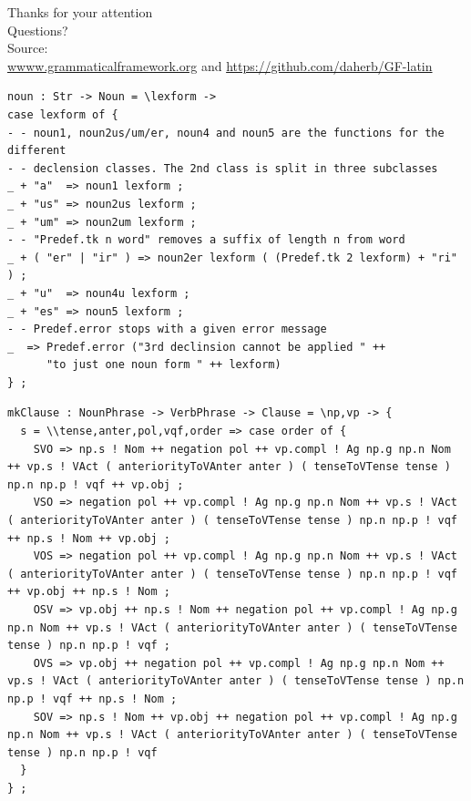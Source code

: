 \documentclass[compress,table]{beamer} %
\newcommand{\nologo}{\setbeamertemplate{logo}{}}
\begin{document}
\begin{frame}
  {\huge
  Thanks for your attention \\[3em]
  \pause
  Questions? \\[2em]
  }
  Source:\\ \url{wwww.grammaticalframework.org} and \url{https://github.com/daherb/GF-latin}
\end{frame}
\appendix



{\nologo 
  \begin{frame}[fragile]
    \begin{lstlisting}[basicstyle=\tiny\ttfamily]
noun : Str -> Noun = \lexform -> 
case lexform of {
- - noun1, noun2us/um/er, noun4 and noun5 are the functions for the different
- - declension classes. The 2nd class is split in three subclasses
_ + "a"  => noun1 lexform ;
_ + "us" => noun2us lexform ;
_ + "um" => noun2um lexform ;
- - "Predef.tk n word" removes a suffix of length n from word
_ + ( "er" | "ir" ) => noun2er lexform ( (Predef.tk 2 lexform) + "ri" ) ;
_ + "u"  => noun4u lexform ;
_ + "es" => noun5 lexform ;
- - Predef.error stops with a given error message
_  => Predef.error ("3rd declinsion cannot be applied " ++
      "to just one noun form " ++ lexform)
} ;
  \end{lstlisting}
\end{frame}
}

{\nologo 
  \begin{frame}[fragile]
    \begin{lstlisting}[basicstyle=\tiny\ttfamily]
mkClause : NounPhrase -> VerbPhrase -> Clause = \np,vp -> {
  s = \\tense,anter,pol,vqf,order => case order of {
    SVO => np.s ! Nom ++ negation pol ++ vp.compl ! Ag np.g np.n Nom ++ vp.s ! VAct ( anteriorityToVAnter anter ) ( tenseToVTense tense ) np.n np.p ! vqf ++ vp.obj ;
    VSO => negation pol ++ vp.compl ! Ag np.g np.n Nom ++ vp.s ! VAct ( anteriorityToVAnter anter ) ( tenseToVTense tense ) np.n np.p ! vqf ++ np.s ! Nom ++ vp.obj ;
    VOS => negation pol ++ vp.compl ! Ag np.g np.n Nom ++ vp.s ! VAct ( anteriorityToVAnter anter ) ( tenseToVTense tense ) np.n np.p ! vqf ++ vp.obj ++ np.s ! Nom ;
    OSV => vp.obj ++ np.s ! Nom ++ negation pol ++ vp.compl ! Ag np.g np.n Nom ++ vp.s ! VAct ( anteriorityToVAnter anter ) ( tenseToVTense tense ) np.n np.p ! vqf ;
    OVS => vp.obj ++ negation pol ++ vp.compl ! Ag np.g np.n Nom ++ vp.s ! VAct ( anteriorityToVAnter anter ) ( tenseToVTense tense ) np.n np.p ! vqf ++ np.s ! Nom ;
    SOV => np.s ! Nom ++ vp.obj ++ negation pol ++ vp.compl ! Ag np.g np.n Nom ++ vp.s ! VAct ( anteriorityToVAnter anter ) ( tenseToVTense tense ) np.n np.p ! vqf 
  } 
} ;
\end{lstlisting}
\end{frame}
}
\end{document}
